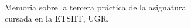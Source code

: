 \documentclass{memoria}
\begin{document}
\newpage
\begin{center}
\end{center}
\vspace{3in}
\begin{center}
\LARGE{\thetitle}\\
\end{center}

\vspace{2in}

\begin{flushright}
Memoria sobre la tercera práctica de la asignatura \curso \\ cursada en la ETSIIT, UGR.
\\
\vspace{0.2in}

\theauthor


\end{flushright}

\vfill
\begin{center}
\end{center}

\newpage

\pagestyle{plain} %
\tableofcontents

\listoffigures

\listoftables


\newpage






\nocite{*}


\end{document}
